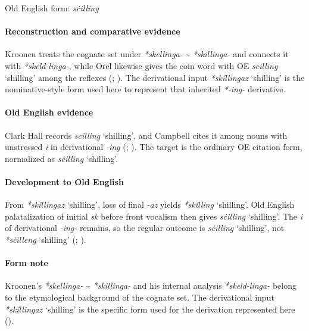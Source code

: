 \documentclass[
  british,
  a4paper,
]{article}
\providecommand{\Recon}[1]{\emph{*#1}}
\begin{document}
Old English form: \emph{sċilling}

\paragraph{Reconstruction and comparative
evidence}\label{reconstruction-and-comparative-evidence-48}

Kroonen treats the cognate set under \emph{*skellinga-}
\textasciitilde{} \emph{*skillinga-} and connects it with
\emph{*skeld-linga-}, while Orel likewise gives the coin word with OE
{\emph{scilling}} `shilling' among the reflexes
(; ). The derivational input \Recon{skíllingaz} `shilling' is the
nominative-style form used here to represent that inherited
\emph{*-ing-} derivative.

\paragraph{Old English evidence}\label{old-english-evidence-48}

Clark Hall records \emph{scilling} `shilling', and Campbell cites it
among nouns with unstressed \emph{i} in derivational \emph{-ing}
(;
). The target is the ordinary
OE citation form, normalized as \emph{sċilling} `shilling'.

\paragraph{Development to Old
English}\label{development-to-old-english-48}

From \Recon{skíllingaz} `shilling', loss of final \emph{-az} yields
\Recon{skílling} `shilling'. Old English palatalization of initial
\emph{sk} before front vocalism then gives \emph{sċilling} `shilling'.
The \emph{i} of derivational \emph{-ing-} remains, so the regular
outcome is \emph{sċilling} `shilling', not \Recon{sċilleng} `shilling'
(;
).

\paragraph{Form note}\label{form-note-15}

Kroonen's \emph{*skellinga-} \textasciitilde{} \emph{*skillinga-} and
his internal analysis \emph{*skeld-linga-} belong to the etymological
background of the cognate set. The derivational input \Recon{skíllingaz}
`shilling' is the specific form used for the derivation represented here
().
\end{document}

